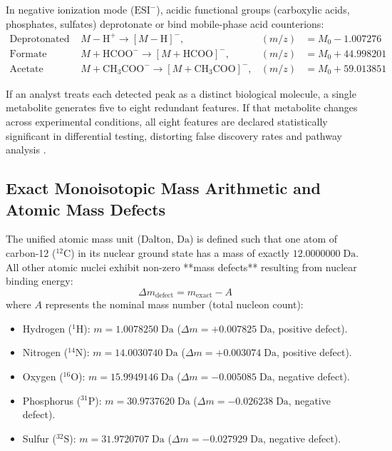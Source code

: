 \documentclass[11pt,twoside,openright]{book}
\begin{document}
In negative ionization mode ($\text{ESI}^-$), acidic functional groups (carboxylic acids, phosphates, sulfates) deprotonate or bind mobile-phase acid counterions:
\begin{align}
\text{Deprotonated molecule: } & M - \text{H}^+ \xrightarrow{} [M-\text{H}]^-, & (m/z) &= M_0 - 1.007276 \\
\text{Formate adduct: } & M + \text{HCOO}^- \xrightarrow{} [M+\text{HCOO}]^-, & (m/z) &= M_0 + 44.998201 \\
\text{Acetate adduct: } & M + \text{CH}_3\text{COO}^- \xrightarrow{} [M+\text{CH}_3\text{COO}]^-, & (m/z) &= M_0 + 59.013851
\end{align}

If an analyst treats each detected peak as a distinct biological molecule, a single metabolite generates five to eight redundant features. If that metabolite changes across experimental conditions, all eight features are declared statistically significant in differential testing, distorting false discovery rates and pathway analysis \cite{kuhl2012camera}.

\subsection{Exact Monoisotopic Mass Arithmetic and Atomic Mass Defects}

The unified atomic mass unit (Dalton, $\text{Da}$) is defined such that one atom of carbon-12 ($^{12}\text{C}$) in its nuclear ground state has a mass of exactly $12.0000000\;\text{Da}$. All other atomic nuclei exhibit non-zero **mass defects** resulting from nuclear binding energy:
\begin{equation}
\Delta m_{\text{defect}} = m_{\text{exact}} - A
\end{equation}
where $A$ represents the nominal mass number (total nucleon count):
\begin{itemize}
    \item Hydrogen ($^{1}\text{H}$): $m = 1.0078250\;\text{Da}$ ($\Delta m = +0.007825\;\text{Da}$, positive defect).
    \item Nitrogen ($^{14}\text{N}$): $m = 14.0030740\;\text{Da}$ ($\Delta m = +0.003074\;\text{Da}$, positive defect).
    \item Oxygen ($^{16}\text{O}$): $m = 15.9949146\;\text{Da}$ ($\Delta m = -0.005085\;\text{Da}$, negative defect).
    \item Phosphorus ($^{31}\text{P}$): $m = 30.9737620\;\text{Da}$ ($\Delta m = -0.026238\;\text{Da}$, negative defect).
    \item Sulfur ($^{32}\text{S}$): $m = 31.9720707\;\text{Da}$ ($\Delta m = -0.027929\;\text{Da}$, negative defect).
\end{itemize}
\end{document}

